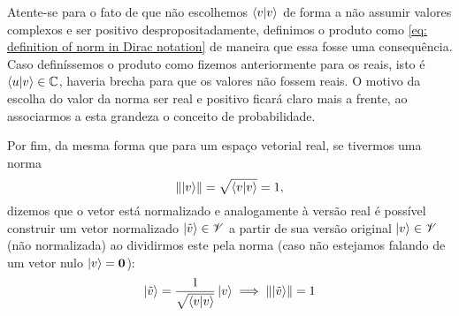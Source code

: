 Atente-se para o fato de que não escolhemos $\braket{v}{v}$ de forma a não assumir valores complexos e ser positivo despropositadamente, definimos o produto como \eqref{eq: definition of norm in Dirac notation} de maneira que essa fosse uma consequência. Caso definíssemos o produto como fizemos anteriormente para os reais, isto é $\braket{u}{v}\in\mathbb{C}$, haveria brecha para que os valores não fossem reais. O motivo da escolha do valor da norma ser real e positivo ficará claro mais a frente, ao associarmos a esta grandeza o conceito de probabilidade.

Por fim, da mesma forma que para um espaço vetorial real, se tivermos uma norma 
\begin{equation*}
    \norm{\ket{v}} = \sqrt{\braket{v}{v}} = 1,
\end{equation*}
dizemos que o vetor está normalizado e analogamente à versão real é possível construir um vetor normalizado $\ket{\tilde{v}}\in\mathscr{V}$ a partir de sua versão original $\ket{v}\in\mathscr{V}$ (não normalizada) ao dividirmos este pela norma (caso não estejamos falando de um vetor nulo $\ket{v} = \vb{0}$):
    \begin{equation*}
        \ket{\Tilde{v}} = \frac{1}{\sqrt{\braket{v}{v}}}\ket{v} \implies \norm{\ket{\tilde{v}}} = 1
    \end{equation*}